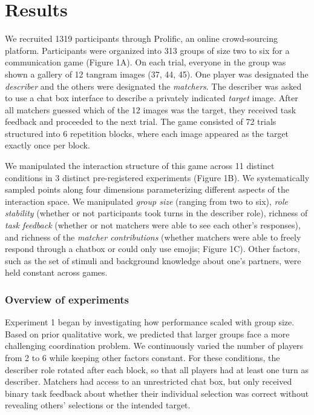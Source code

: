 \documentclass[9pt,twocolumn,twoside]{pnas-new}
\begin{document}
\section*{Results}\label{results}

We recruited 1319 participants through Prolific, an online
crowd-sourcing platform. Participants were organized into 313 groups of
size two to six for a communication game (Figure 1A).
On each trial, everyone in the group was shown a gallery of 12 tangram
images (37, 44, 45). One player was designated the \emph{describer} and
the others were designated the \emph{matchers}. The describer was asked
to use a chat box interface to describe a privately indicated
\emph{target} image. After all matchers guessed which of the 12 images
was the target, they received task feedback and proceeded to the next
trial. The game consisted of 72 trials structured into 6 repetition
blocks, where each image appeared as the target exactly once per block.

We manipulated the interaction structure of this game across 11 distinct
conditions in 3 distinct pre-registered experiments (Figure
1B). We systematically sampled points along four
dimensions parameterizing different aspects of the interaction space. We
manipulated \emph{group size} (ranging from two to six), \emph{role
stability} (whether or not participants took turns in the describer
role), richness of \emph{task feedback} (whether or not matchers were
able to see each other's responses), and richness of the \emph{matcher
contributions} (whether matchers were able to freely respond through a
chatbox or could only use emojis; Figure 1C). Other
factors, such as the set of stimuli and background knowledge about one's
partners, were held constant across games.

\subsubsection*{Overview of experiments}\label{overview-of-experiments}

Experiment 1 began by investigating how performance scaled with group
size. Based on prior qualitative work, we predicted that larger groups
face a more challenging coordination problem. We continuously varied the
number of players from 2 to 6 while keeping other factors constant. For
these conditions, the describer role rotated after each block, so that
all players had at least one turn as describer. Matchers had access to
an unrestricted chat box, but only received binary task feedback about
whether their individual selection was correct without revealing others'
selections or the intended target.
\end{document}
